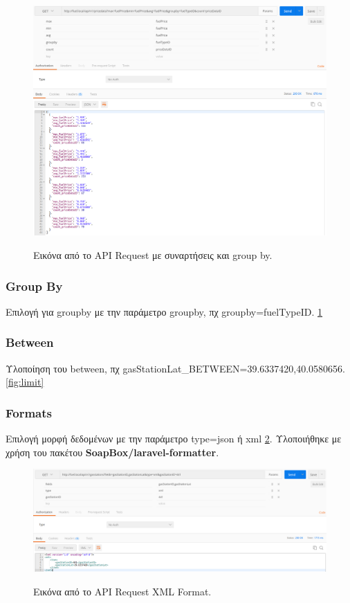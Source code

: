 \begin{figure}[H]
  \caption{Εικόνα από το API Request με συναρτήσεις και group by.}
  \centering
    \includegraphics[width=1\textwidth]{img/aggregate.png}
    \label{fig:aggregate}
\end{figure}

\subsubsection{Group By}
Επιλογή για groupby με την παράμετρο groupby, πχ groupby=fuelTypeID. \ref{fig:aggregate}

\subsubsection{Between}
Υλοποίηση του between, πχ gasStationLat\_BETWEEN=39.6337420,40.0580656. \ref{fig:limit}

\subsubsection{Formats}
Επιλογή μορφή δεδομένων με την παράμετρο type=json ή xml \ref{fig:format}. Υλοποιήθηκε με χρήση του πακέτου \textbf{SoapBox/laravel-formatter}. \cite{laravel-formatter}

\begin{figure}[H]
  \caption{Εικόνα από το API Request XML Format.}
  \centering
    \includegraphics[width=1\textwidth]{img/format.png}
    \label{fig:format}
\end{figure}

